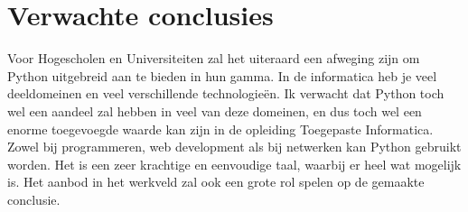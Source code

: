 \section{Verwachte conclusies}
\label{sec:verwachte_conclusies}

Voor Hogescholen en Universiteiten zal het uiteraard een afweging zijn om Python uitgebreid aan te bieden in hun gamma. In de informatica heb je veel deeldomeinen en veel verschillende technologieën. Ik verwacht dat Python toch wel een aandeel zal hebben in veel van deze domeinen, en dus toch wel een enorme toegevoegde waarde kan zijn in de opleiding Toegepaste Informatica. Zowel bij programmeren, web development als bij netwerken kan Python gebruikt worden. Het is een zeer krachtige en eenvoudige taal, waarbij er heel wat mogelijk is. Het aanbod in het werkveld zal ook een grote rol spelen op de gemaakte conclusie.

